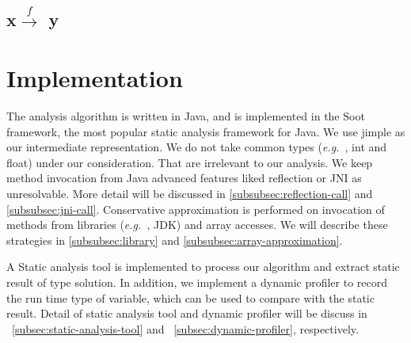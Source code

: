 \documentclass{fac}
\newcommand\eg{\textit{e.g.\ }}
\newcommand{\hflow}{\longrightarrow}
\newcommand{\lhflow}[1]{\stackrel{#1}{\hflow}}
\begin{document}
\subsection{x$\lhflow{f}$ y}

\section{Implementation}\label{sec:implementation}
The analysis algorithm is written in Java, and is implemented in the Soot framework, the most popular static analysis framework for Java. We use jimple as our intermediate representation. 
We do not take common types (\eg, int and float) under our consideration. That are irrelevant to our analysis. We keep method invocation from Java advanced features liked reflection or JNI as unresolvable. More detail will be discussed in \ref{subsubsec:reflection-call} and \ref{subsubsec:jni-call}. Conservative approximation is performed on invocation of methods from libraries (\eg, JDK) and array accesses. We will describe these strategies in \ref{subsubsec:library} and \ref{subsubsec:array-approximation}.

A Static analysis tool is implemented to process our algorithm and extract static result of type solution. In addition, we implement a dynamic profiler to record the run time type of variable, which can be used to compare with the static result. Detail of static analysis tool and dynamic profiler will be discuss in ~\ref{subsec:static-analysis-tool} and ~\ref{subsec:dynamic-profiler}, respectively.
\end{document}
